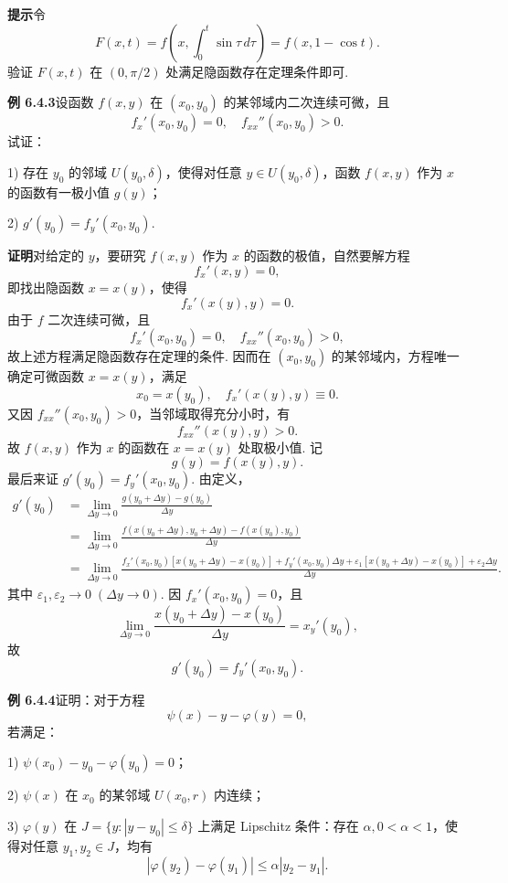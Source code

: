 \documentclass[UTF8, 12pt, fontset=fandol, oneside]{ctexart}
\begin{document}
\noindent\textbf{提示}\quad 令
\[
  F(x,t)=f\left(x,\int_0^t\sin\tau\,d\tau\right)
  =f(x,1-\cos t).
\]
验证 $F(x,t)$ 在 $(0,\pi/2)$ 处满足隐函数存在定理条件即可.

\noindent\textbf{例 6.4.3}\quad 设函数 $f(x,y)$ 在 $(x_0,y_0)$ 的某邻域内二次连续可微，且
\[
  f_x'(x_0,y_0)=0,\quad f_{xx}''(x_0,y_0)>0.
\]
试证：

1) 存在 $y_0$ 的邻域 $U(y_0,\delta)$，使得对任意 $y\in U(y_0,\delta)$，函数 $f(x,y)$ 作为 $x$ 的函数有一极小值 $g(y)$；

2) $g'(y_0)=f_y'(x_0,y_0)$.

\noindent\textbf{证明}\quad 对给定的 $y$，要研究 $f(x,y)$ 作为 $x$ 的函数的极值，自然要解方程
\[
  f_x'(x,y)=0,
\]
即找出隐函数 $x=x(y)$，使得
\[
  f_x'(x(y),y)=0.
\]
由于 $f$ 二次连续可微，且
\[
  f_x'(x_0,y_0)=0,\quad f_{xx}''(x_0,y_0)>0,
\]
故上述方程满足隐函数存在定理的条件. 因而在 $(x_0,y_0)$ 的某邻域内，方程唯一确定可微函数 $x=x(y)$，满足
\[
  x_0=x(y_0),\quad f_x'(x(y),y)\equiv0.
\]
又因 $f_{xx}''(x_0,y_0)>0$，当邻域取得充分小时，有
\[
  f_{xx}''(x(y),y)>0.
\]
故 $f(x,y)$ 作为 $x$ 的函数在 $x=x(y)$ 处取极小值. 记
\[
  g(y)=f(x(y),y).
\]
最后来证 $g'(y_0)=f_y'(x_0,y_0)$. 由定义，
\[
\begin{aligned}
  g'(y_0)
  &=
  \lim_{\Delta y\to0}
  \frac{g(y_0+\Delta y)-g(y_0)}{\Delta y}       \\
  &=
  \lim_{\Delta y\to0}
  \frac{
    f(x(y_0+\Delta y),y_0+\Delta y)-f(x(y_0),y_0)
  }{\Delta y}                                  \\
  &=
  \lim_{\Delta y\to0}
  \frac{
    f_x'(x_0,y_0)[x(y_0+\Delta y)-x(y_0)]
    +f_y'(x_0,y_0)\Delta y
    +\varepsilon_1[x(y_0+\Delta y)-x(y_0)]
    +\varepsilon_2\Delta y
  }{\Delta y}.
\end{aligned}
\]
其中 $\varepsilon_1,\varepsilon_2\to0\;(\Delta y\to0)$. 因 $f_x'(x_0,y_0)=0$，且
\[
  \lim_{\Delta y\to0}
  \frac{x(y_0+\Delta y)-x(y_0)}{\Delta y}
  =x_y'(y_0),
\]
故
\[
  g'(y_0)=f_y'(x_0,y_0).
\]

\noindent\textbf{例 6.4.4}\quad 证明：对于方程
\[
  \psi(x)-y-\varphi(y)=0,
\]
若满足：

1) $\psi(x_0)-y_0-\varphi(y_0)=0$；

2) $\psi(x)$ 在 $x_0$ 的某邻域 $U(x_0,r)$ 内连续；

3) $\varphi(y)$ 在 $J=\{y:|y-y_0|\le\delta\}$ 上满足 Lipschitz 条件：存在 $\alpha,0<\alpha<1$，使得对任意 $y_1,y_2\in J$，均有
\begin{equation}
  |\varphi(y_2)-\varphi(y_1)|\le\alpha|y_2-y_1|.
\end{equation}
\end{document}
